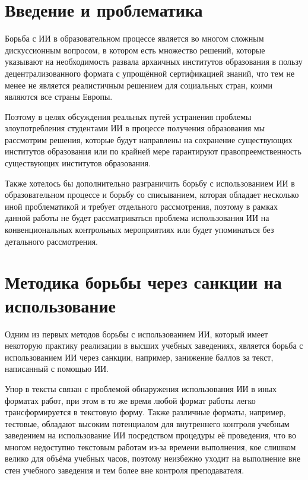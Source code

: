 \documentclass[12pt,a4paper]{article}
\newcommand{\DocTitle}{Методы борьбы с ИИ}
\newcommand{\Discipline}{Социология}
\begin{document}

\fancyhead[L]{\DocTitle}
\fancyhead[R]{\Discipline}
\fancyfoot[C]{\thepage}

\section{Введение и проблематика}

Борьба с ИИ в образовательном процессе является во многом сложным дискуссионным 
вопросом, в котором есть множество
решений, которые указывают на необходимость развала архаичных институтов образования
в пользу децентрализованного формата с упрощённой сертификацией знаний, что тем не 
менее не является реалистичным решением для социальных стран, коими являются
все страны Европы.

Поэтому в целях обсуждения реальных путей устранения проблемы злоупотребления студентами
ИИ в процессе получения образования мы рассмотрим решения, которые будут направлены на 
сохранение существующих институтов образования или по крайней мере гарантируют 
правопреемственность существующих институтов образования.

Также хотелось бы дополнительно разграничить борьбу с использованием ИИ в образовательном 
процессе и борьбу со списыванием, которая обладает несколько иной проблематикой 
и требует отдельного рассмотрения, поэтому в рамках данной работы не будет 
рассматриваться проблема использования ИИ на конвенциональных контрольных мероприятиях
или будет упоминаться без детального рассмотрения.

\section{Методика борьбы через санкции на использование}

Одним из первых методов борьбы с использованием ИИ, который имеет некоторую 
практику реализации в высших учебных заведениях, является борьба с использованием ИИ 
через санкции, например, занижение баллов за текст, написанный с помощью ИИ. 

Упор в тексты связан с проблемой обнаружения использования ИИ в иных форматах работ, 
при этом в то же время любой формат работы легко трансформируется в текстовую форму.  
Также различные форматы, например, тестовые, обладают высоким потенциалом для внутреннего 
контроля учебным заведением на использование ИИ посредством процедуры её проведения, 
что во многом недоступно текстовым работам из-за времени выполнения, кое слишком велико
для объёма учебных часов, поэтому неизбежно уходит на выполнение вне стен учебного 
заведения и тем более вне контроля преподавателя.
\end{document}
